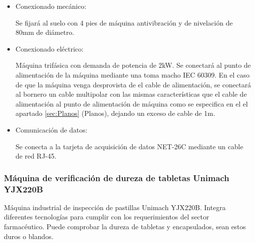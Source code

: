 		\begin{itemize}
				\item{Conexionado mecánico:}
				
				Se fijará al suelo con 4 pies de máquina antivibración y de nivelación de 80mm de diámetro.

				\item{Conexionado eléctrico:}

				Máquina trifásica con demanda de potencia de 2kW. Se conectará al punto de alimentación de la máquina mediante una  toma macho IEC 60309. En el caso de que la máquina venga desprovista de el cable de alimentación, se conectará al bornero un cable multipolar con las mismas características que el cable de alimentación al punto de alimentación de máquina como se especifica en el el apartado \ref{sec:Planos} (Planos), dejando un exceso de cable de 1m. \
								
				\item{Comunicación de datos:}

				Se conecta a la tarjeta de acquisición de datos NET-26C mediante un cable de red RJ-45.
		\end{itemize}

	\newpage

	\subsubsection{Máquina de verificación de dureza de tabletas Unimach YJX220B}

		
	Máquina industrial de inspección de pastillas Unimach YJX220B. Integra diferentes tecnologías para cumplir con los requerimientos del sector farmacéutico. Puede comprobar la dureza de tabletas y encapsulados, sean estos duros o blandos.\\

